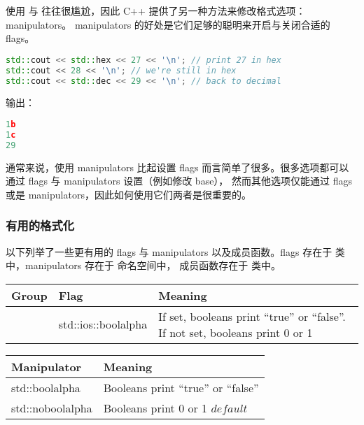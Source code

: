 \documentclass[../../LearnCpp.tex]{subfiles}
\begin{document}
使用  与  往往很尴尬，因此 C++ 提供了另一种方法来修改格式选项：manipulators。
manipulators 的好处是它们足够的聪明来开启与关闭合适的 flags。

\begin{lstlisting}[language=C++]
std::cout << std::hex << 27 << '\n'; // print 27 in hex
std::cout << 28 << '\n'; // we're still in hex
std::cout << std::dec << 29 << '\n'; // back to decimal
\end{lstlisting}

输出：

\begin{lstlisting}[language=C++]
1b
1c
29
\end{lstlisting}

通常来说，使用 manipulators 比起设置 flags 而言简单了很多。很多选项都可以通过 flags 与 manipulators 设置（例如修改 base），
然而其他选项仅能通过 flags 或是 manipulators，因此如何使用它们两者是很重要的。

\subsubsection*{有用的格式化}

以下列举了一些更有用的 flags 与 manipulators 以及成员函数。flags 存在于  类中，manipulators 存在于  命名空间中，
成员函数存在于  类中。

\begin{center}
  \begin{tiny}
    \begin{tabularx}{ 1\textwidth}{
        | >{\raggedright\arraybackslash}X
        | >{\raggedright\arraybackslash}X
        | >{\raggedright\arraybackslash}X |
      }
      \hline
      Group & Flag                & Meaning                                                                     \\
      \hline
            & std::ios::boolalpha & If set, booleans print “true” or “false”. If not set, booleans print 0 or 1 \\
      \hline
    \end{tabularx}
  \end{tiny}
\end{center}

\begin{center}
  \begin{tiny}
    \begin{tabularx}{ 1\textwidth}{
        | >{\raggedright\arraybackslash}X
        | >{\raggedright\arraybackslash}X |
      }
      \hline
      Manipulator      & Meaning                           \\
      \hline
      std::boolalpha   & Booleans print “true” or “false”  \\
      std::noboolalpha & Booleans print 0 or 1 \(default\) \\
      \hline
    \end{tabularx}
  \end{tiny}
\end{center}
\end{document}
